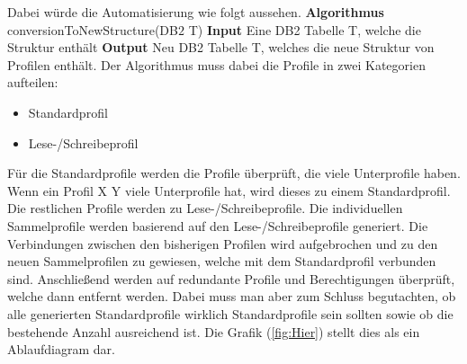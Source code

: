 Dabei würde die Automatisierung wie folgt aussehen.
\newline
\newline
\textbf{Algorithmus} conversionToNewStructure(DB$2$ T)
\newline
\newline
\textbf{Input} Eine DB2 Tabelle T, welche die Struktur enthält
\newline
\newline
\textbf{Output} Neu DB2 Tabelle T, welches die neue Struktur von Profilen enthält.
\newline
\newline
Der Algorithmus muss dabei die Profile in zwei Kategorien aufteilen:
\begin{itemize}
	\item Standardprofil
	\item Lese-/Schreibeprofil
\end{itemize}
Für die Standardprofile werden die Profile überprüft, die viele Unterprofile haben.
Wenn ein Profil X Y viele Unterprofile hat, wird dieses zu einem Standardprofil.
Die restlichen Profile werden zu Lese-/Schreibeprofile.
Die individuellen Sammelprofile werden basierend auf den Lese-/Schreibeprofile generiert.
Die Verbindungen zwischen den bisherigen Profilen wird aufgebrochen und zu den neuen Sammelprofilen zu gewiesen, welche mit dem Standardprofil verbunden sind.
Anschließend werden auf redundante Profile und Berechtigungen überprüft, welche dann entfernt werden.
Dabei muss man aber zum Schluss begutachten, ob alle generierten Standardprofile wirklich Standardprofile sein sollten sowie ob die bestehende Anzahl ausreichend ist.
Die Grafik (\ref{fig:Hier}) stellt dies als ein Ablaufdiagram dar.
